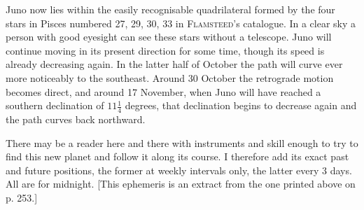 Juno now lies within the easily recognisable quadrilateral formed by the four stars in Pisces numbered 27, 29, 30, 33 in \textsc{Flamsteed}’s catalogue. In a clear sky a person with good eyesight can see these stars without a telescope. Juno will continue moving in its present direction for some time, though its speed is already decreasing again. In the latter half of October the path will curve ever more noticeably to the southeast. Around 30 October the retrograde motion becomes direct, and around 17 November, when Juno will have reached a southern declination of $11\frac{1}{4}$ degrees, that declination begins to decrease again and the path curves back northward.

There may be a reader here and there with instruments and skill enough to try to find this new planet and follow it along its course. I therefore add its exact past and future positions, the former at weekly intervals only, the latter every 3 days. All are for midnight. [This ephemeris is an extract from the one printed above on p. 253.]
